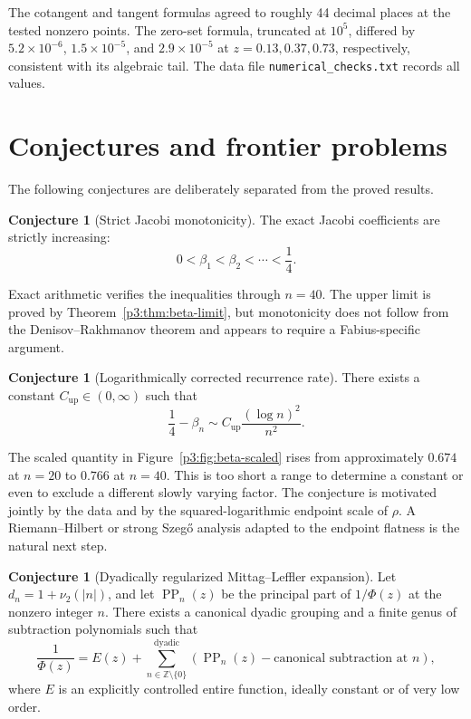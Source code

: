 \documentclass[11pt]{article}
\theoremstyle{definition}
\newtheorem{conjecture}[theorem]{Conjecture}
\theoremstyle{remark}
\newcommand{\Up}{\operatorname{up}}
\begin{document}
The cotangent and tangent formulas agreed to roughly 44 decimal places at the tested
nonzero points.  The zero-set formula, truncated at \(10^5\), differed by
\(5.2\times10^{-6}\), \(1.5\times10^{-5}\), and \(2.9\times10^{-5}\) at
\(z=0.13,0.37,0.73\), respectively, consistent with its algebraic tail.  The data file
\texttt{numerical\_checks.txt} records all values.

\section{Conjectures and frontier problems}

The following conjectures are deliberately separated from the proved results.

\begin{conjecture}[Strict Jacobi monotonicity]\label{p3:conj:beta-monotone}
The exact Jacobi coefficients are strictly increasing:
\begin{equation}
 0<\beta_1<\beta_2<\cdots<\frac14.                            \label{p3:eq:beta-monotone}
\end{equation}
\end{conjecture}

Exact arithmetic verifies the inequalities through \(n=40\).  The upper limit is proved by
Theorem~\ref{p3:thm:beta-limit}, but monotonicity does not follow from the
Denisov--Rakhmanov theorem and appears to require a Fabius-specific argument.

\begin{conjecture}[Logarithmically corrected recurrence rate]\label{p3:conj:beta-rate}
There exists a constant \(C_{\Up}\in(0,\infty)\) such that
\begin{equation}
 \frac14-\beta_n
 \sim C_{\Up}\frac{(\log n)^2}{n^2}.                         \label{p3:eq:beta-rate}
\end{equation}
\end{conjecture}

The scaled quantity in Figure~\ref{p3:fig:beta-scaled} rises from approximately \(0.674\) at
\(n=20\) to \(0.766\) at \(n=40\).  This is too short a range to determine a constant or
even to exclude a different slowly varying factor.  The conjecture is motivated jointly by
the data and by the squared-logarithmic endpoint scale of \(\rho\).  A Riemann--Hilbert or
strong Szeg\H{o} analysis adapted to the endpoint flatness is the natural next step.

\begin{conjecture}[Dyadically regularized Mittag--Leffler expansion]\label{p3:conj:ML}
Let \(d_n=1+\nu_2(|n|)\), and let \(\operatorname{PP}_n(z)\) be the principal part of
\(1/\Phi(z)\) at the nonzero integer \(n\).  There exists a canonical dyadic grouping and a
finite genus of subtraction polynomials such that
\begin{equation}
 \frac1{\Phi(z)}
 =E(z)+\sum_{n\in\mathbb Z\setminus\{0\}}^{\mathrm{dyadic}}
 \left(\operatorname{PP}_n(z)-\text{canonical subtraction at }n\right), \label{p3:eq:ML-conj}
\end{equation}
where \(E\) is an explicitly controlled entire function, ideally constant or of very low
order.
\end{conjecture}
\end{document}
